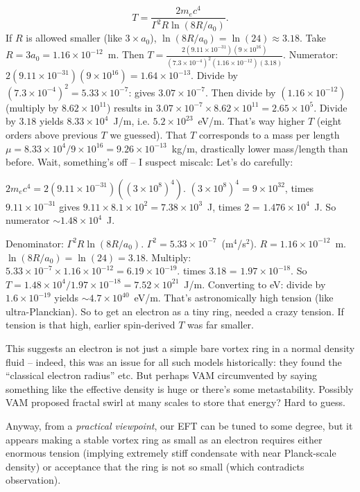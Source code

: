 \documentclass[12pt]{article}
\begin{document}
\begin{equation}
    T = \frac{2 m_e c^4}{\Gamma^2 R \ln(8R/a_0)}.
\end{equation}
If $R$ is allowed smaller (like $3\times a_0$), $\ln(8R/a_0)=\ln(24) \approx 3.18$. Take $R=3a_0 = 1.16\times10^{-12}$~m. Then $T = \frac{2(9.11\times10^{-31})(9\times10^{16})}{(7.3\times10^{-4})^2 (1.16\times10^{-12})(3.18)}$. Numerator: $2(9.11\times10^{-31})(9\times10^{16}) = 1.64\times10^{-13}$. Divide by $(7.3\times10^{-4})^2 = 5.33\times10^{-7}$: gives $3.07\times10^{-7}$. Then divide by $(1.16\times10^{-12})$ (multiply by $8.62\times10^{11}$) results in $3.07\times10^{-7} \times 8.62\times10^{11} = 2.65\times10^5$. Divide by $3.18$ yields $8.33\times10^4$~J/m, i.e. $5.2\times10^{23}$~eV/m. That’s way higher $T$ (eight orders above previous $T$ we guessed). That $T$ corresponds to a mass per length $\mu = 8.33\times10^4/9\times10^{16} = 9.26\times10^{-13}$~kg/m, drastically lower mass/length than before. Wait, something’s off -- I suspect miscalc: Let's do carefully:

$2 m_e c^4 = 2 (9.11\times10^{-31})( (3\times10^8)^4 )$. $(3\times10^8)^4 = 9\times10^{32}$, times $9.11\times10^{-31}$ gives $9.11\times8.1\times10^2 = 7.38\times10^3$~J, times 2 = $1.476\times10^4$~J. So numerator $\sim 1.48\times10^4$~J.

Denominator: $\Gamma^2 R \ln(8R/a_0)$. $\Gamma^2 = 5.33\times10^{-7}$~(m$^4$/s$^2$). $R = 1.16\times10^{-12}$~m. $\ln(8R/a_0) = \ln(24) = 3.18$. Multiply: $5.33\times10^{-7} \times 1.16\times10^{-12} = 6.19\times10^{-19}$. times 3.18 = $1.97\times10^{-18}$. So $T = 1.48\times10^4 / 1.97\times10^{-18} = 7.52\times10^{21}$~J/m. Converting to eV: divide by $1.6\times10^{-19}$ yields $\sim 4.7\times10^{40}$~eV/m. That’s astronomically high tension (like ultra-Planckian). So to get an electron as a tiny ring, needed a crazy tension. If tension is that high, earlier spin-derived $T$ was far smaller.

This suggests an electron is not just a simple bare vortex ring in a normal density fluid -- indeed, this was an issue for all such models historically: they found the ``classical electron radius'' etc. But perhaps VAM circumvented by saying something like the effective density is huge or there's some metastability. Possibly VAM proposed fractal swirl at many scales to store that energy? Hard to guess.

Anyway, from a \textit{practical viewpoint}, our EFT can be tuned to some degree, but it appears making a stable vortex ring as small as an electron requires either enormous tension (implying extremely stiff condensate with near Planck-scale density) or acceptance that the ring is not so small (which contradicts observation).
\end{document}
